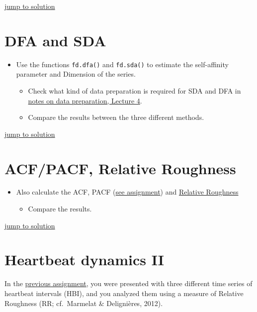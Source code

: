 \documentclass[]{book}
\providecommand{\tightlist}{%
  \setlength{\itemsep}{0pt}\setlength{\parskip}{0pt}}
\let\stdsection\section
\renewcommand\section{\newpage\stdsection}
\begin{document}
\protect\hyperlink{psdsol}{\textbar{} jump to solution \textbar{}}

\section{DFA and SDA}\label{dfa}

\begin{itemize}
\tightlist
\item
  Use the functions \texttt{fd.dfa()} and \texttt{fd.sda()} to estimate
  the self-affinity parameter and Dimension of the series.

  \begin{itemize}
  \tightlist
  \item
    Check what kind of data preparation is required for SDA and DFA in
    \protect\hyperlink{data-considerations}{notes on data preparation,
    Lecture 4}.
  \item
    Compare the results between the three different methods.
  \end{itemize}
\end{itemize}

\protect\hyperlink{dfasol}{\textbar{} jump to solution \textbar{}}

\section{ACF/PACF, Relative Roughness}\label{pacfrel}

\begin{itemize}
\tightlist
\item
  Also calculate the ACF, PACF (\protect\hyperlink{pacf}{see
  assignment}) and \protect\hyperlink{relR}{Relative Roughness}

  \begin{itemize}
  \tightlist
  \item
    Compare the results.
  \end{itemize}
\end{itemize}

\protect\hyperlink{pacfrelrsol}{\textbar{} jump to solution \textbar{}}

\section{Heartbeat dynamics II}\label{hrv2}

In the \protect\hyperlink{relR}{previous assignment}, you were presented
with three different time series of heartbeat intervals (HBI), and you
analyzed them using a measure of Relative Roughness (RR; cf.~Marmelat \&
Delignières, 2012).
\end{document}
